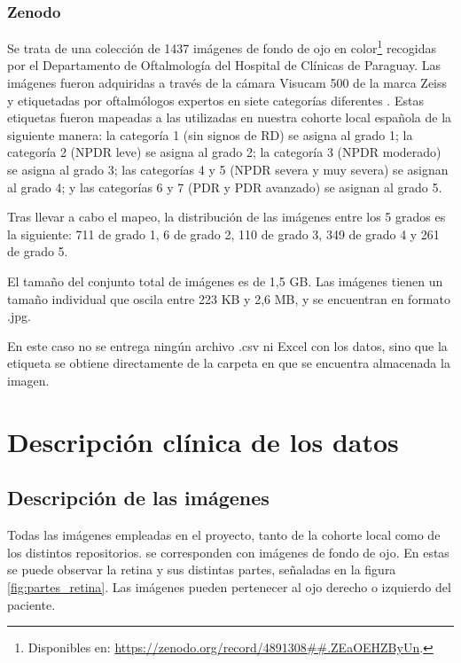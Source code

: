 \subsubsection{Zenodo}

Se trata de una colección de 1437 imágenes de fondo de ojo en color\footnote{Disponibles en: \url{https://zenodo.org/record/4891308##.ZEaOEHZByUn}.} recogidas por el Departamento de Oftalmología del Hospital de Clínicas de Paraguay. Las imágenes fueron adquiridas a través de la cámara Visucam 500 de la marca Zeiss y etiquetadas por oftalmólogos expertos en siete categorías diferentes \cite{datos:zenodo}. Estas etiquetas fueron mapeadas a las utilizadas en nuestra cohorte local española de la siguiente manera: la categoría 1 (sin signos de RD) se asigna al grado 1; la categoría 2 (NPDR leve) se asigna al grado 2; la categoría 3 (NPDR moderado) se asigna al grado 3; las categorías 4 y 5 (NPDR severa y muy severa) se asignan al grado 4; y las categorías 6 y 7 (PDR y PDR avanzado) se asignan al grado 5.

Tras llevar a cabo el mapeo, la distribución de las imágenes entre los 5 grados es la siguiente: 711 de grado 1, 6 de grado 2, 110 de grado 3, 349 de grado 4 y 261 de grado 5.

El tamaño del conjunto total de imágenes es de 1,5 GB. Las imágenes tienen un tamaño individual que oscila entre 223 KB y 2,6 MB, y se encuentran en formato .jpg.

En este caso no se entrega ningún archivo .csv ni Excel con los datos, sino que la etiqueta se obtiene directamente de la carpeta en que se encuentra almacenada la imagen.

\section{Descripción clínica de los datos}

\subsection{Descripción de las imágenes}

Todas las imágenes empleadas en el proyecto, tanto de la cohorte local como de los distintos repositorios. se corresponden con imágenes de fondo de ojo. En estas se puede observar la retina y sus distintas partes, señaladas en la figura \ref{fig:partes_retina}. Las imágenes pueden pertenecer al ojo derecho o izquierdo del paciente.

